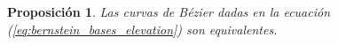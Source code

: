 \documentclass[11pt]{book}
\theoremstyle{plain} %
\newtheorem{proposicion}[teorema]{Proposición}
\theoremstyle{definition} %
\theoremstyle{definition} %
\begin{document}
\begin{proposicion}\label{prop:bernstein_bases_elevation}
    Las curvas de Bézier dadas en la ecuación (\ref{eq:bernstein_bases_elevation}) son equivalentes.
\end{proposicion}
\end{document}

